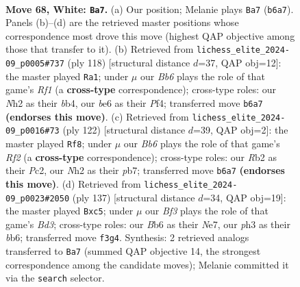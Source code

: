 \documentclass[11pt]{article}
\begin{document}
\clearpage

\begin{figure}[p]\centering
\begin{subfigure}{0.46\textwidth}\centering
\resizebox{\linewidth}{!}{%
\newchessgame
\chessboard[
  setfen={8/4k3/1B2b3/2K5/P7/1P3Brp/1R5N/8 w - - 14 68},
  showmover=false,
  pgfstyle=straightmove, color=movearrow, markmove={b6-a7}
]}
\caption{}
\end{subfigure}\hfill
\begin{subfigure}{0.46\textwidth}\centering
\resizebox{\linewidth}{!}{%
\newchessgame
\chessboard[
  setfen={8/5k2/8/2P5/1b1B1P2/6P1/p2r4/5RK1 w - - 1 60},
  showmover=false,
  pgfstyle=straightmove, color=movearrow, markmove={f1-a1}
]}
\caption{}
\end{subfigure}
\\[4pt]
\begin{subfigure}{0.46\textwidth}\centering
\resizebox{\linewidth}{!}{%
\newchessgame
\chessboard[
  setfen={8/1p6/2b4r/8/P2p4/1P1B2k1/2PK1R2/8 w - - 7 62},
  showmover=false,
  pgfstyle=straightmove, color=movearrow, markmove={f2-f8}
]}
\caption{}
\end{subfigure}\hfill
\begin{subfigure}{0.46\textwidth}\centering
\resizebox{\linewidth}{!}{%
\newchessgame
\chessboard[
  setfen={8/4n3/1B1b1kp1/1KP5/8/7p/1P1r4/1R6 b - - 0 69},
  showmover=false,
  pgfstyle=straightmove, color=movearrow, markmove={d6-c5}
]}
\caption{}
\end{subfigure}
\caption{\textbf{Move 68, White: \texttt{Ba7}.} (a) Our position; Melanie plays \texttt{Ba7} (\texttt{b6a7}). Panels (b)--(d) are the retrieved master positions whose correspondence most drove this move (highest QAP objective among those that transfer to it). (b) Retrieved from \texttt{lichess\_elite\_2024-09\_p0005\#737} (ply 118) [structural distance $d$=37, QAP obj=12]: the master played \texttt{Ra1}; under $\mu$ our \emph{Bb6} plays the role of that game's \emph{Rf1} (a \textbf{cross-type} correspondence); cross-type roles: our \emph{N}h2 as their \emph{b}b4, our \emph{b}e6 as their \emph{P}f4; transferred move \texttt{b6a7} \textbf{(endorses this move)}. (c) Retrieved from \texttt{lichess\_elite\_2024-09\_p0016\#73} (ply 122) [structural distance $d$=39, QAP obj=2]: the master played \texttt{Rf8}; under $\mu$ our \emph{Bb6} plays the role of that game's \emph{Rf2} (a \textbf{cross-type} correspondence); cross-type roles: our \emph{R}b2 as their \emph{P}c2, our \emph{N}h2 as their \emph{p}b7; transferred move \texttt{b6a7} \textbf{(endorses this move)}. (d) Retrieved from \texttt{lichess\_elite\_2024-09\_p0023\#2050} (ply 137) [structural distance $d$=34, QAP obj=19]: the master played \texttt{Bxc5}; under $\mu$ our \emph{Bf3} plays the role of that game's \emph{Bd3}; cross-type roles: our \emph{B}b6 as their \emph{N}e7, our \emph{p}h3 as their \emph{b}b6; transferred move \texttt{f3g4}. Synthesis: 2 retrieved analogs transferred to \texttt{Ba7} (summed QAP objective 14, the strongest correspondence among the candidate moves); Melanie committed it via the \texttt{search} selector.}
\label{fig:thought-m134}
\end{figure}
\end{document}
